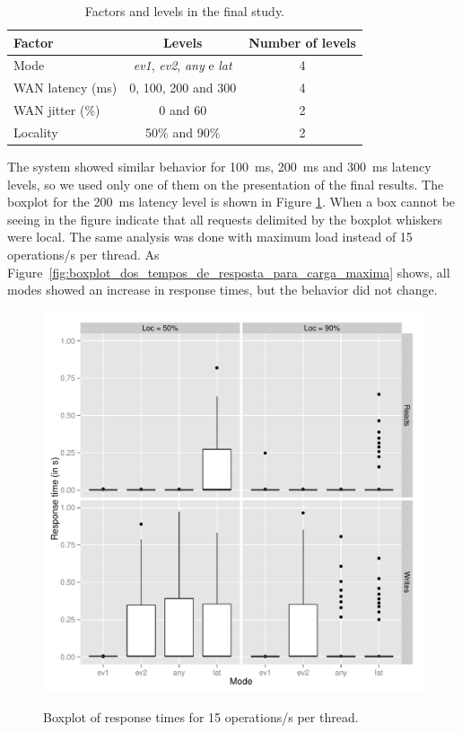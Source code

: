 \documentclass[doublespacing]{bmcart}
\begin{document}
\begin{table}[h!]
\caption{Factors and levels in the final study.}
\begin{tabular}{lcc} \hline

Factor & Levels & Number of levels\\\hline

Mode & \textit{ev1}, \textit{ev2}, \textit{any} e \textit{lat} & 4\\

WAN latency (ms) & 0, 100, 200 and 300 & 4\\

WAN jitter (\%) & 0 and 60 & 2\\

Locality & 50\% and 90\% & 2\\\hline

\end{tabular}

\label{tab:fatores_e_niveis_do_estudo_final}

\end{table}

The system showed similar behavior for 100~ms, 200~ms and 300~ms latency levels, so we used only one of them on the presentation of the final results. The boxplot for the 200~ms latency level is shown in Figure \ref{fig:boxplot_dos_tempos_de_resposta}.
When a box cannot be seeing in the figure indicate that all requests delimited
by the boxplot whiskers were local. The same analysis was done with maximum load
instead of 15 operations/s per thread. As
Figure~\ref{fig:boxplot_dos_tempos_de_resposta_para_carga_maxima} shows, all
modes showed an increase in response times, but the behavior did not change.

\begin{figure}[h!]
\caption{Boxplot of response times for 15 operations/s per thread.}
\includegraphics[width=1.0\textwidth]{boxplot200.png}
\label{fig:boxplot_dos_tempos_de_resposta}
\end{figure}
\end{document}

